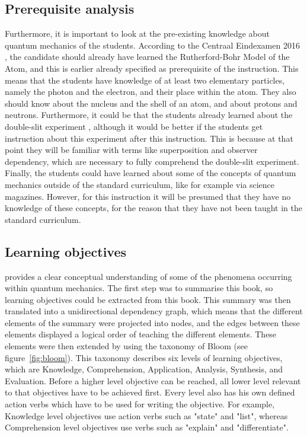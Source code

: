 \documentclass[11pt,twoside]{report} %
\begin{document}
\subsection{Prerequisite analysis}

Furthermore, it is important to look at the pre-existing knowledge about quantum mechanics of the students. According to the Centraal Eindexamen 2016 \cite{eindexamen2016}, the candidate should already have learned the Rutherford-Bohr Model of the Atom, and this is earlier already specified as prerequisite of the instruction. This means that the students have knowledge of at least two elementary particles, namely the photon and the electron, and their place within the atom. They also should know about the nucleus and the shell of an atom, and about protons and neutrons. Furthermore, it could be that the students already learned about the double-slit experiment \cite{eindexamen2015}, although it would be better if the students get instruction about this experiment after this instruction. This is because at that point they will be familiar with terms like superposition and observer dependency, which are necessary to fully comprehend the double-slit experiment. Finally, the students could have learned about some of the concepts of quantum mechanics outside of the standard curriculum, like for example via science magazines. However, for this instruction it will be presumed that they have no knowledge of these concepts, for the reason that they have not been taught in the standard curriculum.

\subsection{Learning objectives}

 provides a clear conceptual understanding of some of the phenomena occurring within quantum mechanics. The first step was to summarise this book, so learning objectives could be extracted from this book. This summary was then translated into a unidirectional dependency graph, which means that the different elements of the summary were projected into nodes, and the edges between these elements displayed a logical order of teaching the different elements. These elements were then extended by using the taxonomy of Bloom \cite{bloom} (see figure~\ref{fig:bloom}). This taxonomy describes six levels of learning objectives, which are Knowledge, Comprehension, Application, Analysis, Synthesis, and Evaluation. Before a higher level objective can be reached, all lower level relevant to that objectives have to be achieved first. Every level also has his own defined action verbs which have to be used for writing the objective. For example, Knowledge level objectives use action verbs such as "state" and "list", whereas Comprehension level objectives use verbs such as "explain" and "differentiate".
\end{document}
